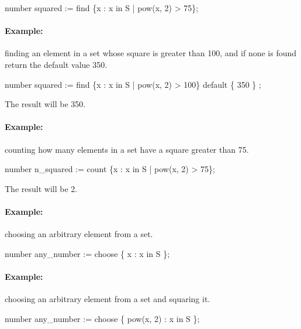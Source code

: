 \vspace{2mm}

{\tok number squared := find \{x : x in S | pow(x, 2) > 75\};}

\vspace{2mm}

\paragraph{Example:} finding an element in a set whose square is
greater than 100, and if none is found return the default value 350.

\vspace{2mm}

{\tok number squared := find \{x : x in S | pow(x, 2) > 100\}
      default \{ 350 \} ;}

\vspace{2mm}

\noindent
The result will be 350.

\paragraph{Example:} counting how many elements in a set have a square
greater than 75.

\vspace{2mm}

{\tok number n\_squared := count \{x : x in S | pow(x, 2) > 75\};}

\vspace{2mm}

\noindent
The result will be 2.

\paragraph{Example:} choosing an arbitrary element from a set.

\vspace{2mm}

{\tok number any\_number := choose \{ x : x in S \};}

\paragraph{Example:} choosing an arbitrary element from a set and
squaring it.

\vspace{2mm}

{\tok number any\_number := choose \{ pow(x, 2) : x in S \};}


